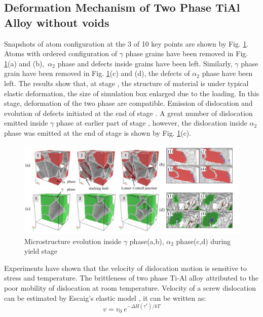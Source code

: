 \documentclass[materials,article,submit,moreauthors,pdftex,10pt,a4paper]{Definitions/mdpi}
\begin{document}
\subsection{Deformation Mechanism of Two Phase TiAl Alloy without voids}
Snapshots of atom configuration at the 3 of 10 key points are shown by Fig. \ref{fig:Defect}.  Atoms with ordered configuration  of $\gamma$ phase grains have been removed in Fig. \ref{fig:Defect}(a) and (b),\ $\alpha_2$ phase and defects inside grains have been left. Similarly, $\gamma$ phase grain have been removed in Fig. \ref{fig:Defect}(c) and (d), the defects of $\alpha_2$ phase have been left.  The results show that, at stage \uppercase\expandafter{}, the structure of material is under typical elastic deformation, the size of simulation box enlarged due to the loading. In this stage, deformation of the two phase are compatible. Emission of dislocation and evolution of defects initiated at the end of stage \uppercase\expandafter{}. A  great number of dislocation emitted inside $\gamma$ phase at earlier part of stage \uppercase\expandafter{}, however, the dislocation inside $\alpha_2$ phase was emitted at the end of stage \uppercase\expandafter{} is shown by Fig. \ref{fig:Defect}(c).  
\begin{figure}[ht] 
	\centering
	\includegraphics[width=1\linewidth]{img/def-box}
	\caption{Microstructure evolution inside $\gamma$ phase(a,b), $\alpha_2$ phase(c,d) during yield stage}
	\label{fig:Defect}
\end{figure}
Experiments have shown that the velocity of dislocation motion is sensitive to stress and temperature\cite{Stein1960}. The brittleness of two phase Ti-Al alloy attributed to the poor mobility of dislocation at room temperature. Velocity of a screw dislocation can be estimated by Escaig's elastic model \cite{Escaig1968}, it can be written as:
\begin{equation}\label{eq:temp-dis}
v = v_0\ e^{-\Delta H(\tau^*)/kT}
\end{equation}
\end{document}
